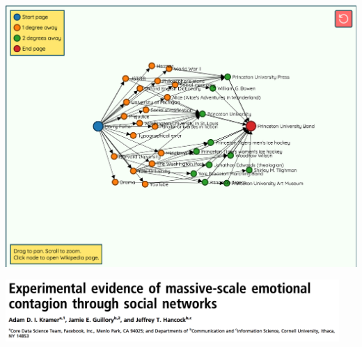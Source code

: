 \documentclass[aspectratio=169]{beamer}
\begin{document}
\begin{frame}

\begin{center}
\includegraphics[height=0.9\textheight]{figures/six_degrees_wikipedia_example}
\end{center}

\vfill
{}

\end{frame}
\begin{frame}

\begin{center}
\includegraphics[width=0.95\textwidth]{figures/kramer_experimental_2014_title}
\end{center}

\vfill
{}

\end{frame}
\end{document}
